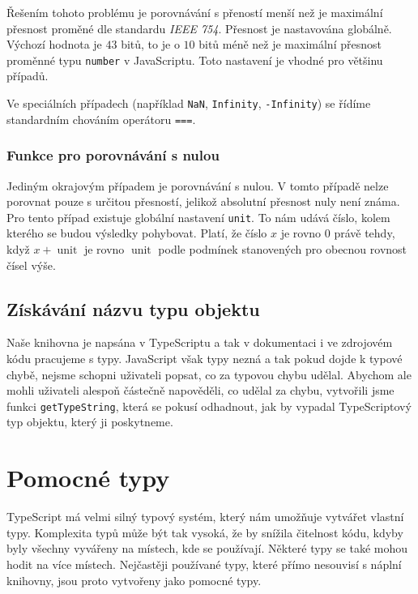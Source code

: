 Řešením tohoto problému je porovnávání s přeností menší než je maximální přesnost proměné dle standardu \textit{IEEE 754}. 
Přesnost je nastavována globálně.
Výchozí hodnota je $43$ bitů, to je o $10$ bitů méně než je maximální přesnost proměnné typu \texttt{number} v JavaScriptu.
Toto nastavení je vhodné pro většinu případů.

Ve speciálních případech (například \texttt{NaN}, \texttt{Infinity}, \texttt{-Infinity}) se řídíme standardním chováním operátoru \texttt{===}.

\subsubsection[Rovnost nule]{Funkce pro porovnávání s nulou}
\label{subsubsec:helper-function-compare-to-zero}

Jediným okrajovým případem je porovnávání s nulou.
V tomto případě nelze porovnat pouze s určitou přesností, jelikož absolutní přesnost nuly není známa.
Pro tento případ existuje globální nastavení \texttt{unit}. 
To nám udává číslo, kolem kterého se budou výsledky pohybovat. 
Platí, že číslo $x$ je rovno 0 právě tehdy, když $x + \mathop{unit}$ je rovno $\mathop{unit}$ podle podmínek stanovených pro obecnou rovnost čísel výše.

\subsection[Název typu]{Získávání názvu typu objektu}
\label{subsec:getting-type-name}

Naše knihovna je napsána v TypeScriptu a tak v dokumentaci i ve zdrojovém kódu pracujeme s typy.
JavaScript však typy nezná a tak pokud dojde k typové chybě, nejsme schopni uživateli popsat, co za typovou chybu udělal.
Abychom ale mohli uživateli alespoň částečně napověděli, co udělal za chybu, vytvořili jsme funkci \texttt{getTypeString}\cite{geometryjs:source:helpers:getTypeString.ts}, která se pokusí odhadnout, jak by vypadal TypeScriptový typ objektu, který ji poskytneme.

\section{Pomocné typy}
\label{sec:helper-types}

TypeScript má velmi silný typový systém, který nám umožňuje vytvářet vlastní typy.
Komplexita typů může být tak vysoká, že by snížila čitelnost kódu, kdyby byly všechny vyvářeny na místech, kde se používají.
Některé typy se také mohou hodit na více místech.
Nejčastěji používané typy, které přímo nesouvisí s náplní knihovny, jsou proto vytvořeny jako pomocné typy.

